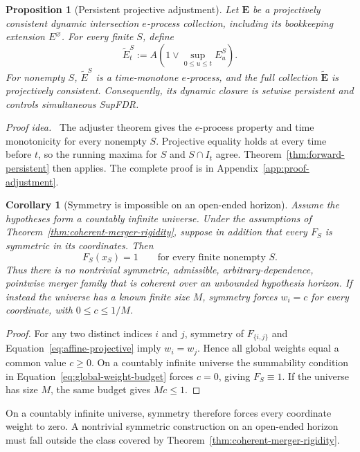 \documentclass[11pt]{article}
\numberwithin{equation}{section}
\theoremstyle{plain}
\newtheorem{proposition}[theorem]{Proposition}
\newtheorem{corollary}[theorem]{Corollary}
\theoremstyle{definition}
\newcommand{\proofidea}{\par\medskip\noindent\textit{Proof idea.}\ }
\begin{document}
\begin{proposition}[Persistent projective adjustment]\label{prop:projective-adjustment}
Let $\mathbf E$ be a projectively consistent dynamic intersection $e$-process collection, including its bookkeeping extension $E^\varnothing$. For every finite $S$, define
\[
  \widetilde E_t^S
  :=A\!\left(1\vee\sup_{0\leq u\leq t}E_u^S\right).
\]
For nonempty $S$, $\widetilde E^S$ is a time-monotone $e$-process, and the full collection $\widetilde{\mathbf E}$ is projectively consistent. Consequently, its dynamic closure is setwise persistent and controls simultaneous SupFDR.
\end{proposition}

\proofidea
The adjuster theorem gives the $e$-process property and time monotonicity for every nonempty $S$. Projective equality holds at every time before $t$, so the running maxima for $S$ and $S\cap I_t$ agree. Theorem~\ref{thm:forward-persistent} then applies. The complete proof is in Appendix~\ref{app:proof-adjustment}.

\begin{corollary}[Symmetry is impossible on an open-ended horizon]\label{cor:symmetric-no-go}
Assume the hypotheses form a countably infinite universe. Under the assumptions of Theorem~\ref{thm:coherent-merger-rigidity}, suppose in addition that every $F_S$ is symmetric in its coordinates. Then
\[
  F_S(x_S)=1
  \qquad\text{for every finite nonempty }S.
\]
Thus there is no nontrivial symmetric, admissible, arbitrary-dependence, pointwise merger family that is coherent over an unbounded hypothesis horizon. If instead the universe has a known finite size $M$, symmetry forces $w_i=c$ for every coordinate, with $0\leq c\leq1/M$.
\end{corollary}

\begin{proof}
For any two distinct indices $i$ and $j$, symmetry of $F_{\{i,j\}}$ and Equation~\eqref{eq:affine-projective} imply $w_i=w_j$. Hence all global weights equal a common value $c\geq0$. On a countably infinite universe the summability condition in Equation~\eqref{eq:global-weight-budget} forces $c=0$, giving $F_S\equiv1$. If the universe has size $M$, the same budget gives $Mc\leq1$.
\end{proof}

On a countably infinite universe, symmetry therefore forces every coordinate weight to zero. A nontrivial symmetric construction on an open-ended horizon must fall outside the class covered by Theorem~\ref{thm:coherent-merger-rigidity}.
\end{document}
